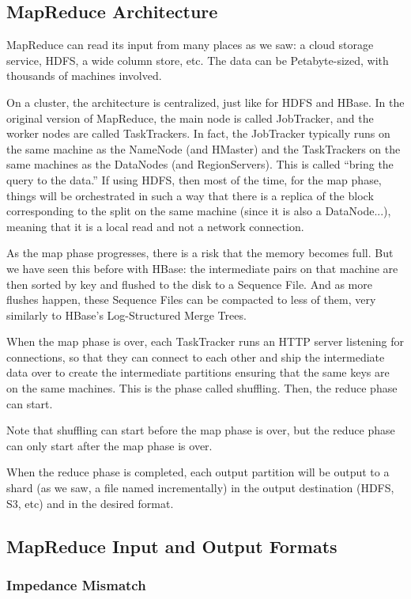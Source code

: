 \subsection{MapReduce Architecture}
MapReduce can read its input from many places as we saw: a cloud storage service, HDFS, a wide column store, etc. The data can be Petabyte-sized, with thousands of machines involved.

On a cluster, the architecture is centralized, just like for HDFS and HBase. In the original version of MapReduce, the main node is called JobTracker, and the worker nodes are called TaskTrackers. In fact, the JobTracker typically runs on the same machine as the NameNode (and HMaster) and the TaskTrackers on the same machines as the DataNodes (and RegionServers). This is called “bring the query to the data.” If using HDFS, then most of the time, for the map phase, things will be orchestrated in such a way that there is a replica of the block corresponding to the split on the same machine (since it is also a DataNode...), meaning that it is a local read and not a network connection.

As the map phase progresses, there is a risk that the memory becomes full. But we have seen this before with HBase: the intermediate pairs on that machine are then sorted by key and flushed to the disk to a Sequence File. And as more flushes happen, these Sequence Files can be compacted to less of them, very similarly to HBase’s Log-Structured Merge Trees.

When the map phase is over, each TaskTracker runs an HTTP server listening for connections, so that they can connect to each other and ship the intermediate data over to create the intermediate partitions ensuring that the same keys are on the same machines. This is the phase called shuffling. Then, the reduce phase can start.

Note that shuffling can start before the map phase is over, but the reduce phase can only start after the map phase is over.

When the reduce phase is completed, each output partition will be output to a shard (as we saw, a file named incrementally) in the output destination (HDFS, S3, etc) and in the desired format.

\subsection{MapReduce Input and Output Formats}

\subsubsection{Impedance Mismatch}

